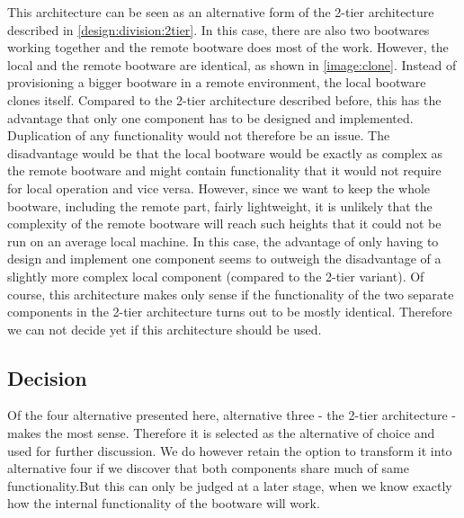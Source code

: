 This architecture can be seen as an alternative form of the 2-tier architecture described in \autoref{design:division:2tier}.
In this case, there are also two bootwares working together and the remote bootware does most of the work.
However, the local and the remote bootware are identical, as shown in \autoref{image:clone}.
Instead of provisioning a bigger bootware in a remote environment, the local bootware clones itself.
Compared to the 2-tier architecture described before, this has the advantage that only one component has to be designed and implemented.
Duplication of any functionality would not therefore be an issue.
The disadvantage would be that the local bootware would be exactly as complex as the remote bootware and might contain functionality that it would not require for local operation and vice versa.
However, since we want to keep the whole bootware, including the remote part, fairly lightweight, it is unlikely that the complexity of the remote bootware will reach such heights that it could not be run on an average local machine.
In this case, the advantage of only having to design and implement one component seems to outweigh the disadvantage of a slightly more complex local component (compared to the 2-tier variant).
Of course, this architecture makes only sense if the functionality of the two separate components in the 2-tier architecture turns out to be mostly identical.
Therefore we can not decide yet if this architecture should be used.

\subsection{Decision}

Of the four alternative presented here, alternative three - the 2-tier architecture - makes the most sense.
Therefore it is selected as the alternative of choice and used for further discussion.
We do however retain the option to transform it into alternative four if we discover that both components share much of same functionality.But this can only be judged at a later stage, when we know exactly how the internal functionality of the bootware will work.
